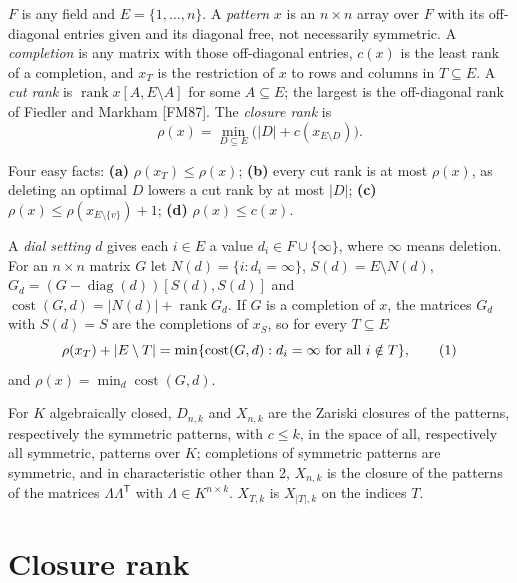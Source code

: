 \documentclass[11pt,letterpaper,reqno]{amsart}
\theoremstyle{spaced}
\begin{document}
\begingroup{} \(F\) is any field and \(E = \{1, \dots, n\}\). A \emph{pattern} \(x\) is an \(n \times n\) array over \(F\) with its off-diagonal entries given and its diagonal free, not necessarily symmetric. A \emph{completion} is any matrix with those off-diagonal entries, \(c(x)\) is the least rank of a completion, and \(x_T\) is the restriction of \(x\) to rows and columns in \(T \subseteq E\). A \emph{cut rank} is \(\operatorname{rank} x[A, E \setminus A]\) for some \(A \subseteq E\); the largest is the off-diagonal rank of Fiedler and Markham {[}FM87{]}. The \emph{closure rank} is
\[\rho(x) = \min_{D \subseteq E} \big( \lvert D\rvert + c(x_{E \setminus D}) \big).\]\par\endgroup

Four easy facts: \textbf{(a)} \(\rho(x_T) \le \rho(x)\); \textbf{(b)} every cut rank is at most \(\rho(x)\), as deleting an optimal \(D\) lowers a cut rank by at most \(\lvert D\rvert\); \textbf{(c)} \(\rho(x) \le \rho(x_{E \setminus \{v\}}) + 1\); \textbf{(d)} \(\rho(x) \le c(x)\).

\begingroup{} A \emph{dial setting} \(d\) gives each \(i \in E\) a value \(d_i \in F \cup \{\infty\}\), where \(\infty\) means deletion. For an \(n \times n\) matrix \(G\) let \(N(d) = \{i : d_i = \infty\}\), \(S(d) = E \setminus N(d)\), \(G_d = (G - \operatorname{diag}(d))[S(d), S(d)]\) and \(\operatorname{cost}(G, d) = \lvert N(d)\rvert + \operatorname{rank} G_d\). If \(G\) is a completion of \(x\), the matrices \(G_d\) with \(S(d) = S\) are the completions of \(x_S\), so for every \(T \subseteq E\)
\[\rho(x_T) + \lvert E \setminus T\rvert = \min \{ \operatorname{cost}(G, d) : d_i = \infty \text{ for all } i \notin T \}, \tag{1}\postdisplaypenalty=10000 \]
and \(\rho(x) = \min_d \operatorname{cost}(G, d)\).\par\endgroup

For \(K\) algebraically closed, \(D_{n,k}\) and \(X_{n,k}\) are the Zariski closures of the patterns, respectively the symmetric patterns, with \(c \le k\), in the space of all, respectively all symmetric, patterns over \(K\); completions of symmetric patterns are symmetric, and in characteristic other than 2, \(X_{n,k}\) is the closure of the patterns of the matrices \(\Lambda\Lambda^{\mathsf T}\) with \(\Lambda \in K^{n \times k}\). \(X_{T,k}\) is \(X_{\lvert T\rvert, k}\) on the indices \(T\).

\hypertarget{closure-rank}{%
\section{Closure rank}\label{closure-rank}}
\end{document}
